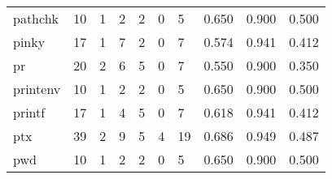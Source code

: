 \begin{longtable}{lp{2.0cm}p{2.0cm}p{2.0cm}p{2.0cm}p{2.0cm}p{2.0cm}p{2.0cm}p{2.0cm}p{2.0cm}}
pathchk   &                     10 &                                             1 &                                            2 &                                           2 &                                            0 &                                          5 &                                0.650 &                                  0.900 &                                0.500 \\
pinky     &                     17 &                                             1 &                                            7 &                                           2 &                                            0 &                                          7 &                                0.574 &                                  0.941 &                                0.412 \\
pr        &                     20 &                                             2 &                                            6 &                                           5 &                                            0 &                                          7 &                                0.550 &                                  0.900 &                                0.350 \\
printenv  &                     10 &                                             1 &                                            2 &                                           2 &                                            0 &                                          5 &                                0.650 &                                  0.900 &                                0.500 \\
printf    &                     17 &                                             1 &                                            4 &                                           5 &                                            0 &                                          7 &                                0.618 &                                  0.941 &                                0.412 \\
ptx       &                     39 &                                             2 &                                            9 &                                           5 &                                            4 &                                         19 &                                0.686 &                                  0.949 &                                0.487 \\
pwd       &                     10 &                                             1 &                                            2 &                                           2 &                                            0 &                                          5 &                                0.650 &                                  0.900 &                                0.500 \\

\end{longtable}
